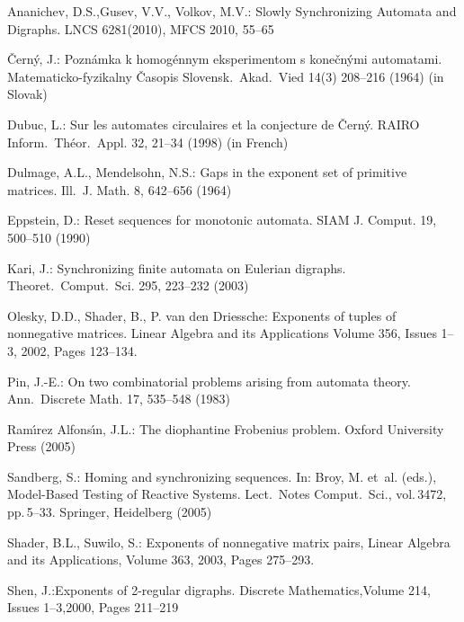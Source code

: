 \documentclass[12pt,twoside]{article}
\begin{document}
\begin{thebibliography}{99}


Ananichev, D.S.,Gusev, V.V., Volkov, M.V.: Slowly Synchronizing Automata and Digraphs.
LNCS 6281(2010), MFCS 2010, 55--65


\v{C}ern\'{y}, J.: Pozn\'{a}mka k homog\'{e}nnym eksperimentom s
kone\v{c}n\'{y}mi automatami. Matematicko-fyzikalny \v{C}asopis
Slovensk.\ Akad.\ Vied 14(3) 208--216 (1964) (in Slovak)

Dubuc, L.: Sur les automates circulaires et la conjecture de
\v{C}ern\'y. RAIRO Inform.\ Th\'eor.\ Appl. 32, 21--34 (1998) (in
French)


Dulmage, A.L., Mendelsohn, N.S.: Gaps in the exponent set of primitive
matrices. Ill.\ J. Math. 8, 642--656 (1964)

Eppstein, D.: Reset sequences for monotonic automata. SIAM J.
Comput. 19, 500--510 (1990)


Kari, J.: Synchronizing finite automata on Eulerian digraphs.
Theoret.\ Comput.\ Sci. 295, 223--232 (2003)

Olesky, D.D., Shader, B., P. van den Driessche: Exponents of tuples of nonnegative matrices. Linear Algebra and its Applications
Volume 356, Issues 1--3, 2002, Pages 123--134.

Pin, J.-E.: On two combinatorial problems arising from automata
theory. Ann.\ Discrete Math. 17, 535--548 (1983)

Ram\'{\i}rez Alfons\'{\i}n, J.L.: The diophantine Frobenius problem.
Oxford University Press (2005)

Sandberg, S.: Homing and synchronizing sequences. In: Broy, M.
et~al. (eds.), Model-Based Testing of Reactive Systems. Lect.\
Notes Comput.\ Sci., vol.\,3472, pp.\,5--33. Springer, Heidelberg
(2005)

Shader, B.L., Suwilo, S.: Exponents of nonnegative matrix pairs, Linear Algebra and its Applications, Volume 363, 2003, Pages 275--293.


Shen, J.:Exponents of 2-regular digraphs. Discrete Mathematics,Volume 214, Issues 1--3,2000, Pages 211--219


\end{thebibliography}
\end{document}
